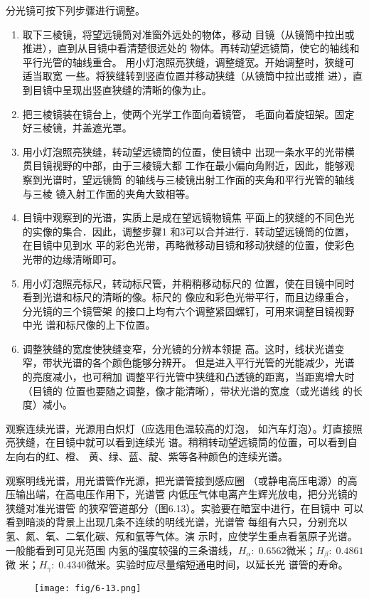 分光镜可按下列步骤进行调整。
\begin{enumerate}
\item 取下三棱镜，将望远镜筒对准窗外远处的物体，移动
目镜（从镜筒中拉出或推进），直到从目镜中看清楚很远处的
物体。再转动望远镜筒，使它的轴线和平行光管的轴线重合。
用小灯泡照亮狭缝，调整缝宽。开始调整时，狭缝可适当取宽
一些。将狭缝转到竖直位置并移动狭缝（从镜筒中拉出或推
进），直到目镜中呈现出竖直狭缝的清晰的像为止。
\item 把三棱镜装在镜台上，使两个光学工作面向着镜管，
毛面向着旋钮架。固定好三棱镜，并盖遮光罩。
\item 用小灯泡照亮狭缝，转动望远镜筒的位置，使目镜中
出现一条水平的光带横贯目镜视野的中部，由于三棱镜大都
工作在最小偏向角附近，因此，能够观察到光谱时，望远镜筒
的轴线与三棱镜出射工作面的夹角和平行光管的轴线与三棱
镜入射工作面的夹角大致相等。
\item 目镜中观察到的光谱，实质上是成在望远镜物镜焦
平面上的狭缝的不同色光的实像的集合．因此，调整步骤1
和3可以合并进行．转动望远镜筒的位置，在目镜中见到水
平的彩色光带，再略微移动目镜和移动狭缝的位置，使彩色
光带的边缘清晰即可。
\item 用小灯泡照亮标尺，转动标尺管，并稍稍移动标尺的
位置，使在目镜中同时看到光谱和标尺的清晰的像。标尺的
像应和彩色光带平行，而且边缘重合，分光镜的三个镜管架
的接口上均有六个调整紧固螺钉，可用来调整目镜视野中光
谱和标尺像的上下位置。
\item 调整狭缝的宽度使狭缝变窄，分光镜的分辨本领提
高。这时，线状光谱变窄，带状光谱的各个颜色能够分辨开。
但是进入平行光管的光能减少，光谱的亮度减小，也可稍加
调整平行光管中狭缝和凸透镜的距离，当距离增大时（目镜的
位置也要随之调整，像才能清晰），带状光谱的宽度（或光谱线
的长度）减小。
\end{enumerate}

观察连续光谱，光源用白炽灯（应选用色温较高的灯泡，
如汽车灯泡）。灯直接照亮狭缝，在目镜中就可以看到连续光
谱。稍稍转动望远镜筒的位置，可以看到自左向右的红、橙、
黄、绿、蓝、靛、紫等各种颜色的连续光谱。

观察明线光谱，用光谱管作光源，把光谱管接到感应圈
（或静电高压电源）的高压输出端，在高电压作用下，光谱管
内低压气体电离产生辉光放电，把分光镜的狭缝对准光谱管
的狭窄管道部分（图6.13）。实验要在暗室中进行，在目镜中
可以看到暗淡的背景上出现几条不连续的明线光谱，光谱管
每组有六只，分别充以氢、氮、氧、二氧化碳、氖和氩等气体。演
示时，应使学生重点看氢原子光谱。一般能看到可见光范围
内氢的强度较强的三条谱线，$H_{\alpha}:\; 0.6562$微米；$H_{\beta}:\; 0.4861$微
米；$H_{\gamma}:\; 0.4340$微米。实验时应尽量缩短通电时间，以延长光
谱管的寿命。
\begin{figure}[htp]
    \centering
\texttt{[image: fig/6-13.png]}
    \caption{}
\end{figure}

